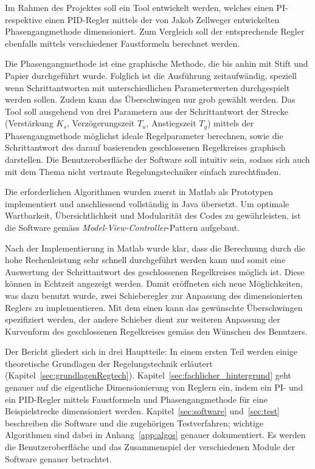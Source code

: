 Im Rahmen  des Projektes soll  ein Tool  entwickelt werden, welches  einen PI-
respektive  einen  PID-Regler mittels  der  von  Jakob Zellweger  entwickelten
Phasengangmethode dimensioniert. Zum  Vergleich soll der  entsprechende Regler
ebenfalls mittels verschiedener Faustformeln berechnet werden.

Die Phasengangmethode ist eine graphische Methode, die bis anhin mit Stift und
Papier  durchgef\"uhrt wurde. Folglich  ist die  Ausf\"uhrung zeitaufw\"andig,
speziell   wenn   Schrittantworten   mit   unterschiedlichen   Parameterwerten
durchgespielt werden sollen. Zudem kann das \"Uberschwingen nur grob gew\"ahlt
werden. Das Tool soll ausgehend von drei Parametern aus der Schrittantwort der
Strecke  (Verst\"arkung $K_s$,  Verz\"ogerungszeit $T_u$,  Anstiegszeit $T_g$)
mittels  der Phasengangmethode  m\"oglichst  ideale Regelparameter  berechnen,
sowie  die Schrittantwort  des darauf  basierenden geschlossenen  Regelkreises
graphisch  darstellen. Die  Benutzeroberfl\"ache  der Software  soll  intuitiv
sein,  sodass  sich auch  mit  dem  Thema nicht  vertraute  Regelungstechniker
einfach zurechtfinden.

Die    erforderlichen    Algorithmen    wurden   zuerst    in    Matlab    als
Prototypen   implementiert    und   anschliessend   vollst\"andig    in   Java
\"ubersetzt. Um  optimale Wartbarkeit,  \"Ubersichtlichkeit und  Modularit\"at
des    Codes     zu    gew\"ahrleisten,    ist    die     Software    gem\"ass
\emph{Model-View-Controller}-Pattern aufgebaut.

Nach  der Implementierung  in Matlab  wurde  klar, dass  die Berechnung  durch
die  hohe Rechenleistung  sehr schnell  durchgef\"uhrt werden  kann und  somit
eine Auswertung  der Schrittantwort  des geschlossenen  Regelkreises m\"oglich
ist.   Diese k\"onnen  in Echtzeit  angezeigt werden. Damit  er\"offneten sich
neue M\"oglichkeiten, was dazu benutzt wurde, zwei Schieberegler zur Anpassung
des  dimensionierten  Reglers  zu   implementieren. Mit  dem  einen  kann  das
gew\"unschte \"Uberschwingen  spezifiziert werden,  der andere  Schieber dient
zur weiteren Anpassung der  Kurvenform des geschlossenen Regelkreises gem\"ass
den W\"unschen des Benutzers.

Der      Bericht      gliedert      sich      in      drei      Hauptteile: In
einem     ersten     Teil     werden    einige     theoretische     Grundlagen
der   Regelungstechnik    erl\"autert   (Kapitel~\ref{sec:grundlagenRegtech}).
Kapitel~\ref{sec:fachlicher_hintergrund}  geht  genauer  auf  die  eigentliche
Dimensionierung  von Reglern  ein, indem  ein PI-  und ein  PID-Regler mittels
Faustformeln  und Phasengangmethode  f\"ur eine  Beispielstrecke dimensioniert
werden.    Kapitel~\ref{sec:software}   und~\ref{sec:test}   beschreiben   die
Software  und  die  zugeh\"origen  Testverfahren;  wichtige  Algorithmen  sind
dabei   in   Anhang~\ref{app:algos}   genauer  dokumentiert. Es   werden   die
Benutzeroberfl\"ache  und  das  Zusammenspiel  der  verschiedenen  Module  der
Software genauer betrachtet.
